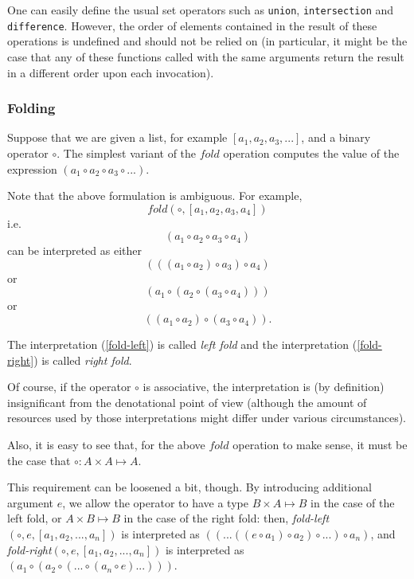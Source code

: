 One can easily define the usual set operators such as \texttt{union},
\texttt{intersection} and \texttt{difference}. However, the order
of elements contained in the result of these operations is undefined
and should not be relied on (in particular, it might be the case
that any of these functions called with the same arguments return
the result in a different order upon each invocation).

\subsubsection{Folding}

Suppose that we are given a list, for example $[a_1,a_2,a_3,...]$,
and a binary operator $\circ$. The simplest variant of the $fold$
operation computes the value of the expression
$(a_1 \circ a_2 \circ a_3 \circ ...)$.

Note that the above formulation is ambiguous. For example,
\begin{equation*}
  fold(\circ, [a_1,a_2,a_3,a_4])
\end{equation*}
i.e.
\begin{equation*}
  (a_1 \circ a_2 \circ a_3 \circ a_4)
\end{equation*}
can be interpreted as either
\begin{equation} \label{fold-left}
  (((a_1 \circ a_2) \circ a_3) \circ a_4)
\end{equation}
or
\begin{equation} \label{fold-right}
  (a_1 \circ (a_2 \circ (a_3 \circ a_4)))
\end{equation}
or
\begin{equation} \label{fold-tree}
  ((a_1 \circ a_2)\circ(a_3 \circ a_4)).
\end{equation}

The interpretation (\ref{fold-left}) is called \emph{left fold}
and the interpretation (\ref{fold-right}) is called \emph{right fold}.

Of course, if the operator $\circ$ is associative, the interpretation
is (by definition) insignificant from the denotational point of
view (although the amount of resources used by those interpretations
might differ under various circumstances).

Also, it is easy to see that, for the above $fold$ operation
to make sense, it must be the case that $\circ : A \times A \mapsto A$.

This requirement can be loosened a bit, though. By introducing
additional argument $e$, we allow the operator to have a type
$B \times A \mapsto B$ in the case of the left fold, or
$A \times B \mapsto B$ in the case of the right fold: then,
\emph{fold-left}$(\circ, e, [a_1, a_2, ..., a_n])$ is interpreted
as $((...((e \circ a_1) \circ a_2)\circ ...)\circ a_n)$,
and \emph{fold-right}$(\circ, e, [a_1, a_2, ..., a_n])$
is interpreted as $(a_1 \circ (a_2 \circ (... \circ (a_n \circ e) ...)))$.

